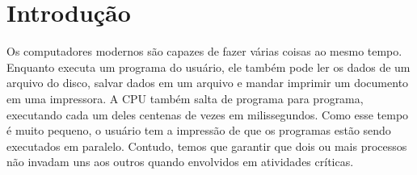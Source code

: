 \chapter{Introdução}

Os computadores modernos são capazes de fazer várias coisas ao mesmo tempo. Enquanto executa um
programa do usuário, ele também pode ler os dados de um arquivo do disco, salvar dados em um arquivo
e mandar imprimir um documento em uma impressora. A CPU também salta de programa para programa, executando
cada um deles centenas de vezes em milissegundos. Como esse tempo é muito pequeno, o usuário tem a impressão 
de que os programas estão sendo executados em paralelo. Contudo, temos que garantir que dois ou mais processos não
invadam uns aos outros quando envolvidos em atividades críticas.

\cite{muchnick}
